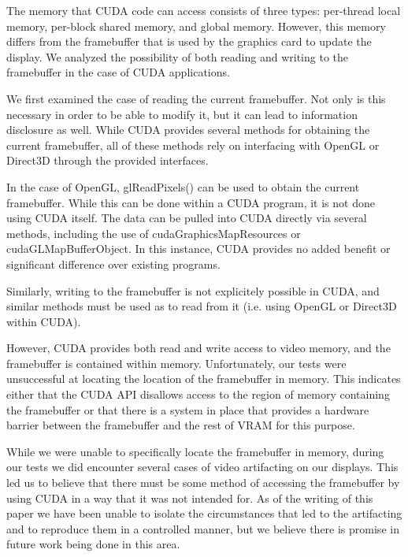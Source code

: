 \documentclass[letterpaper,10pt]{article}
\begin{document}
\begin{multicols}{2}
The memory that CUDA code can access consists of three types: per-thread local memory, 
per-block shared memory, and global memory.  However, this memory differs from the framebuffer 
that is used by the graphics card to update the display.  We analyzed the possibility of both reading 
and writing to the framebuffer in the case of CUDA applications.

We first examined the case of reading the current framebuffer.  Not only is this necessary in order 
to be able to modify it, but it can lead to information disclosure as well.  While CUDA provides several 
methods for obtaining the current framebuffer, all of these methods rely on interfacing with OpenGL or Direct3D 
through the provided interfaces.  

In the case of OpenGL, glReadPixels() can be used to obtain the current framebuffer.  
While this can be done within a CUDA program, it is not done using CUDA itself.  The data can be pulled into CUDA directly 
via several methods, including the use of cudaGraphicsMapResources or cudaGLMapBufferObject\cite{cudaguide}\cite{cudareference}.  In this instance, CUDA provides no added benefit or significant difference over existing programs.

Similarly, writing to the framebuffer is not explicitely possible in CUDA, and similar methods must be used as to read from it (i.e. using OpenGL or Direct3D within CUDA).

However, CUDA provides both read and write access to video memory, and the framebuffer is contained within memory.  Unfortunately, our tests were unsuccessful at locating the location of the framebuffer in memory.  This indicates either that the CUDA API disallows access to the region of memory containing the framebuffer or that there is a system in place that provides a hardware barrier between the framebuffer and the rest of VRAM for this purpose.

While we were unable to specifically locate the framebuffer in memory, during our tests we did encounter several cases of video artifacting on our displays.  This led us to believe that there must be some method of accessing the framebuffer by using CUDA in a way that it was not intended for.  As of the writing of this paper we have been unable to isolate the circumstances that led to the artifacting and to reproduce them in a controlled manner, but we believe there is promise in future work being done in this area.


\end{multicols}
\end{document}
